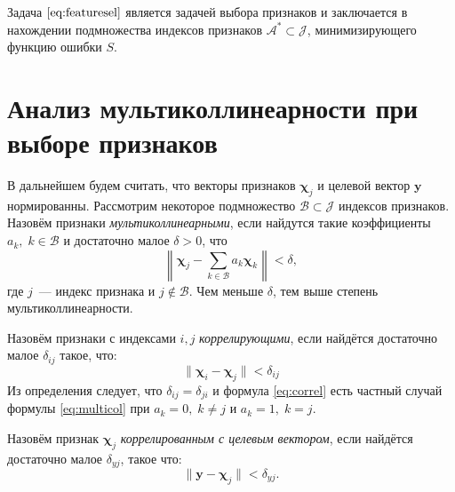 \documentclass[a4paper,12pt]{article}
\newcommand{\bw}{\mathbf{w}}
\newcommand{\by}{\mathbf{y}}
\newcommand{\bX}{\mathbf{X}}
\newcommand{\bA}{\mathbf{A}}
\newcommand{\bchi}{\boldsymbol{\chi}}
\newcommand{\calJ}{\mathcal{J}}
\newcommand{\calA}{\mathcal{A}}
\newcommand{\T}{{\text{\tiny\sffamily\upshape\mdseries T}}}
\theoremstyle{plain}
\begin{document}
Задача $\eqref{eq:featuresel}$ является задачей выбора признаков и заключается в нахождении подмножества индексов признаков $\calA^* \subset \calJ$, минимизирующего функцию ошибки $S$. 

\section{Анализ мультиколлинеарности при выборе признаков}

В дальнейшем будем считать, что векторы признаков $\bchi_j$ и целевой вектор $\by$ нормированны. Рассмотрим некоторое подмножество $\mathcal{B} \subset \calJ$ индексов признаков.   Назовём признаки \emph{мультиколлинеарными}, если найдутся такие коэффициенты $a_k, \; k \in \mathcal{B}$ и достаточно малое $\delta > 0$, что 
\begin{equation}
\left \| \bchi_j - \sum\limits_{k \in \mathcal{B}} a_k \bchi_k \right \| < \delta,
\label{eq:multicol}
\end{equation}
где $j$~--- индекс признака и $j \not\in \mathcal{B} $. Чем меньше $\delta$, тем выше степень мультиколлинеарности. 

Назовём признаки с индексами $i, j$ \emph{коррелирующими}, если найдётся достаточно малое $\delta_{ij}$ такое, что:
\begin{equation}
\| \bchi_i - \bchi_j \| < \delta_{ij}
\label{eq:correl}
\end{equation}
Из определения следует, что $\delta_{ij} = \delta_{ji}$ и формула \eqref{eq:correl} есть частный случай формулы \eqref{eq:multicol} при $a_k = 0, \; k \neq j$ и $a_k = 1, \; k = j$.

Назовём признак $\bchi_j$ \emph{коррелированным с целевым вектором}, если найдётся достаточно малое $\delta_{yj}$, такое что:
\[
\| \by - \bchi_j \| < \delta_{yj}.
\]
 
%
%
\end{document}
